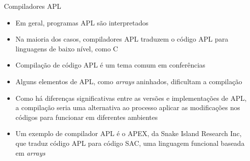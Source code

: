 \begin{frame}[fragile]{Compiladores APL}

    \begin{itemize}
        \item Em geral, programas APL são interpretados
        \pause

        \item Na maioria dos casos, compiladores APL traduzem o código APL para linguagens de baixo nível, como C
        \pause
        \item Compilação de código APL é um tema comum em conferências
        \pause

        \item Alguns elementos de APL, como \textit{arrays} aninhados, dificultam a compilação
        \pause

        \item Como há diferenças significativas entre as versões e implementações de APL, a compilação seria uma alternativa ao processo aplicar as modificações nos códigos para funcionar em diferentes ambientes
        \pause

        \item Um exemplo de compilador APL é o APEX, da Snake Island Research Inc, que traduz código APL para código SAC, uma linguagem funcional baseada em \textit{arrays}
    \end{itemize}

\end{frame}
